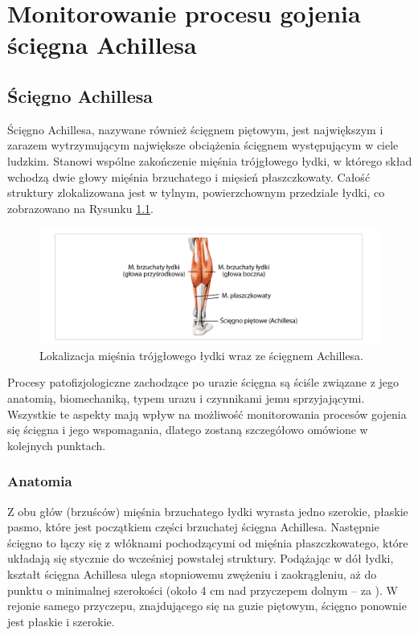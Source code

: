 \chapter{Monitorowanie procesu gojenia ścięgna Achillesa}
\section{Ścięgno Achillesa}
Ścięgno Achillesa, nazywane również ścięgnem piętowym, jest największym i zarazem wytrzymującym największe obciążenia ścięgnem występującym w ciele ludzkim. Stanowi wspólne zakończenie mięśnia trójgłowego łydki, w którego skład wchodzą dwie głowy mięśnia brzuchatego i mięsień płaszczkowaty. Całość struktury zlokalizowana jest w tylnym, powierzchownym przedziale łydki, co zobrazowano na Rysunku \ref{muscle_structure}.  
\begin{figure}[h!]
\centering
\includegraphics[width=1\textwidth]{figures/muscleStructure.png}
\caption{Lokalizacja mięśnia trójgłowego łydki wraz ze ścięgnem Achillesa.}
\label{muscle_structure}
\end{figure}

Procesy patofizjologiczne zachodzące po urazie ścięgna są ściśle związane z jego anatomią, biomechaniką, typem urazu i czynnikami jemu sprzyjającymi. Wszystkie te aspekty mają wpływ na możliwość monitorowania procesów gojenia się ścięgna i jego wspomagania, dlatego zostaną szczegółowo omówione w kolejnych punktach. 

\subsection{Anatomia}
\label{anatomia}

Z obu głów (brzuśców) mięśnia brzuchatego łydki wyrasta jedno szerokie, płaskie pasmo, które jest początkiem części brzuchatej ścięgna Achillesa. Następnie ścięgno to łączy się z włóknami pochodzącymi od mięśnia płaszczkowatego, które układają się stycznie do wcześniej powstałej struktury. Podążając w dół łydki, kształt ścięgna Achillesa ulega stopniowemu zwężeniu i zaokrągleniu, aż do punktu o minimalnej szerokości (około 4 cm nad przyczepem dolnym -- za \cite{Doral2010}). W rejonie samego przyczepu, znajdującego się na guzie piętowym, ścięgno ponownie jest płaskie i szerokie.

